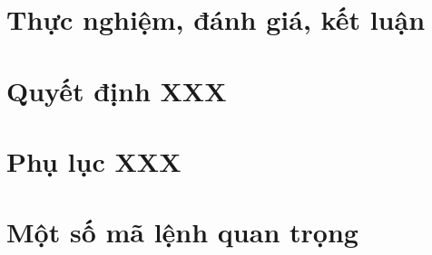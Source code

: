 \documentclass[a4paper,oneside,openright]{memoir}
\begin{document}
\chapter{Thực nghiệm, đánh giá, kết luận}




\nocite{*} %


\appendix

\chapter{Quyết định XXX}



%

\chapter{Phụ lục XXX}


\chapter{Một số mã lệnh quan trọng}

\end{document}
